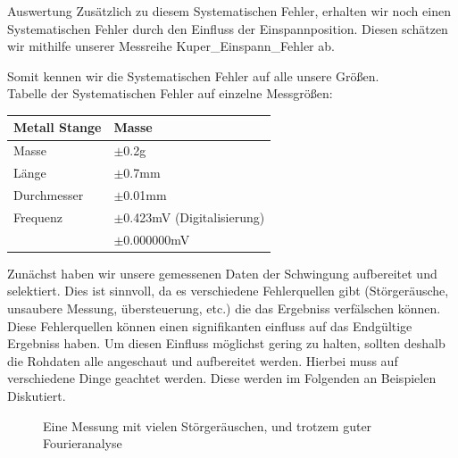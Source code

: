 \documentclass[twoside]{protokoll}
\begin{document}
\begin{aufgabe}{Auswertung}
Zusätzlich zu diesem Systematischen Fehler, erhalten wir noch einen Systematischen Fehler durch den Einfluss der Einspannposition. Diesen schätzen wir mithilfe unserer Messreihe Kuper\_Einspann\_Fehler ab.  

Somit kennen wir die Systematischen Fehler auf alle unsere Größen.\\


Tabelle der Systematischen Fehler auf einzelne Messgrößen: 

 \begin{table}[H]
        \centering
        \begin{tabularx}{0.8\textwidth}{X l} %
            \toprule
            \textbf{Metall Stange} & \textbf{Masse} \\
            \midrule
            Masse & $\pm$0.2g \\
            Länge & $\pm$0.7mm\\
            Durchmesser & $\pm$0.01mm \\
            Frequenz & $\pm$0.423mV (Digitalisierung)\\
            & $\pm$0.000000mV\\
            \bottomrule
        \end{tabularx}
        \label{tab:mytable}
    \end{table}
    
    Zunächst haben wir unsere gemessenen Daten der Schwingung aufbereitet und selektiert.
    Dies ist sinnvoll, da es verschiedene Fehlerquellen gibt (Störgeräusche, unsaubere Messung, übersteuerung, etc.) die das Ergebniss verfälschen können.
    Diese Fehlerquellen können einen signifikanten einfluss auf das Endgültige Ergebniss haben.
    Um diesen Einfluss möglichst gering zu halten, sollten deshalb die Rohdaten alle angeschaut und aufbereitet werden.
    Hierbei muss auf verschiedene Dinge geachtet werden.
    Diese werden im Folgenden an Beispielen Diskutiert. 


\begin{figure}[H]
    \caption{Eine Messung mit vielen Störgeräuschen, und trotzem guter Fourieranalyse}
  \centering
\end{figure}
 

\end{aufgabe}
\end{document}
